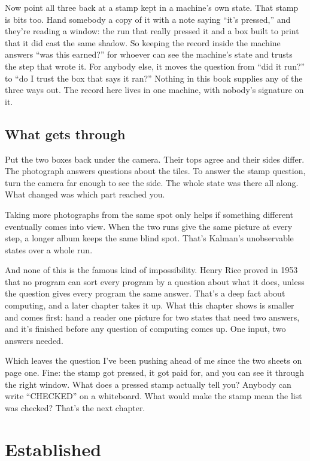 \documentclass[11pt,twoside]{article}
\theoremstyle{thielethm}
\theoremstyle{thieledef}
\theoremstyle{thieledef}
\theoremstyle{thieledef}
\theoremstyle{thielethm}
\theoremstyle{thieleobs}
\theoremstyle{thielethm}
\begin{document}
Now point all three back at a stamp kept in a machine's own state. That stamp is bits too. Hand somebody a copy of it with a note saying ``it's pressed,'' and they're reading a window: the run that really pressed it and a box built to print that it did cast the same shadow. So keeping the record inside the machine answers ``was this earned?'' for whoever can see the machine's state and trusts the step that wrote it. For anybody else, it moves the question from ``did it run?'' to ``do I trust the box that says it ran?'' Nothing in this book supplies any of the three ways out. The record here lives in one machine, with nobody's signature on it.

\subsection{What gets through}

Put the two boxes back under the camera. Their tops agree and their sides differ. The photograph answers questions about the tiles. To answer the stamp question, turn the camera far enough to see the side. The whole state was there all along. What changed was which part reached you.

Taking more photographs from the same spot only helps if something different eventually comes into view. When the two runs give the same picture at every step, a longer album keeps the same blind spot. That's Kalman's unobservable states over a whole run.

And none of this is the famous kind of impossibility. Henry Rice proved in 1953 that no program can sort every program by a question about what it does, unless the question gives every program the same answer. That's a deep fact about computing, and a later chapter takes it up. What this chapter shows is smaller and comes first: hand a reader one picture for two states that need two answers, and it's finished before any question of computing comes up. One input, two answers needed.

Which leaves the question I've been pushing ahead of me since the two sheets on page one. Fine: the stamp got pressed, it got paid for, and you can see it through the right window. What does a pressed stamp actually tell you? Anybody can write ``CHECKED'' on a whiteboard. What would make the stamp mean the list was checked? That's the next chapter.

\section{Established}
\label{sec:established}
\end{document}
